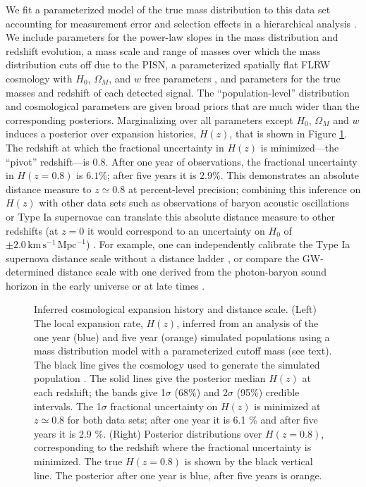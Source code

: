 \documentclass[modern]{aastex62}
\newcommand{\SigmaHPvtOneYear}{6.1 \%}
\newcommand{\SigmaHPvtFiveYear}{2.9 \%}
\newcommand{\SigmaHNaughtTransFiveYear}{2.0}
\newcommand{\zpivot}{0.8}
\newcommand{\kmsMpc}{\mathrm{km} \, \mathrm{s}^{-1} \, \mathrm{Mpc}^{-1}}
\begin{document}
We fit a parameterized model of the true mass distribution to this data set
accounting for measurement error and selection effects in a hierarchical
analysis \citep{Hogg2010,Mandel2010,Loredo2004,Mandel2019,Farr2019}.  We include
parameters for the power-law slopes in the mass distribution and redshift
evolution, a mass scale and range of masses over which the mass distribution
cuts off due to the \ac{PISN}, a parameterized spatially flat FLRW cosmology
with $H_0$, $\Omega_M$, and $w$ free parameters \citep{Hogg1999}, and parameters
for the true masses and redshift of each detected signal.  The
``population-level'' distribution and cosmological parameters are given broad
priors that are much wider than the corresponding posteriors.  Marginalizing
over all parameters except $H_0$, $\Omega_M$ and $w$ induces a posterior over
expansion histories, $H(z)$, that is shown in Figure \ref{fig:Hz}.  The redshift
at which the fractional uncertainty in $H(z)$ is minimized---the ``pivot''
redshift---is $\zpivot{}$.  After one year of observations, the fractional
uncertainty in $H(z = \zpivot)$ is $\SigmaHPvtOneYear{}$; after five years it is
$\SigmaHPvtFiveYear{}$.  This demonstrates an absolute distance measure to $z
\simeq \zpivot{}$ at percent-level precision; combining this inference on $H(z)$
with other data sets such as observations of baryon acoustic oscillations
\citep{BOSS2015} or Type Ia supernovae \citep{Scolnic2018} can translate this
absolute distance measure to other redshifts (at $z = 0$ it would correspond to
an uncertainty on $H_0$ of $\pm \SigmaHNaughtTransFiveYear{} \, \kmsMpc$)
\citep{BOSS2015,Cuesta2015,Feeney2019}. For example, one can independently
calibrate the Type Ia supernova distance scale without a distance ladder
\citep{Feeney2019,Scolnic2018}, or compare the \ac{GW}-determined distance scale
with one derived from the photon-baryon sound horizon
\citep{Cuesta2015,Aylor2019} in the early universe \citep{Planck2016} or at late
times \citep{BOSS2015}.

\begin{figure}
%
  \caption{\label{fig:Hz} Inferred cosmological expansion history and distance
  scale.  (Left) The local expansion rate, $H(z)$, inferred from an analysis of
  the one year (blue) and five year (orange) simulated populations using a mass
  distribution model with a parameterized cutoff mass (see text).  The black
  line gives the cosmology used to generate the simulated population \citep[TT,
  TE, EE + lowP + lensing + ext]{Planck2016}.  The solid lines give the
  posterior median $H(z)$ at each redshift; the bands give 1$\sigma$ (68\%) and
  2$\sigma$ (95\%) credible intervals.  The 1$\sigma$ fractional uncertainty on
  $H(z)$ is minimized at $z \simeq \zpivot{}$ for both data sets; after one year
  it is \SigmaHPvtOneYear{} and after five years it is \SigmaHPvtFiveYear{}.
  (Right) Posterior distributions over $H\left(z = \zpivot{}\right)$,
  corresponding to the redshift where the fractional uncertainty is minimized.
  The true $H\left( z = \zpivot{} \right)$ is shown by the black vertical line.
  The posterior after one year is blue, after five years is orange. }
%
\end{figure}
\end{document}

